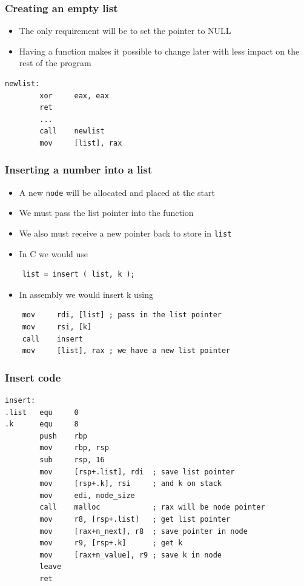 \documentclass{beamer}
\begin{document}
\begin{frame}[fragile]
    \frametitle{Creating an empty list}
    \begin{itemize}
        \item The only requirement will be to set the pointer to NULL
        \item Having a function makes it possible to change later with
              less impact on the rest of the program
    \end{itemize}

\begin{verbatim}
newlist:
        xor     eax, eax
        ret
        ...
        call    newlist
        mov     [list], rax
\end{verbatim}
\end{frame}

\begin{frame}[fragile]
    \frametitle{Inserting a number into a list}
    \begin{itemize}
        \item A new {\tt node} will be allocated and placed at the start
        \item We must pass the list pointer into the function
        \item We also must receive a new pointer back to store in {\tt list}
        \item In C we would use
    \end{itemize}
\begin{verbatim}
    list = insert ( list, k );
\end{verbatim}    
    \begin{itemize}
        \item In assembly we would insert k using
    \end{itemize}
\begin{verbatim}
    mov     rdi, [list] ; pass in the list pointer
    mov     rsi, [k]
    call    insert
    mov     [list], rax ; we have a new list pointer
\end{verbatim}
\end{frame}

\begin{frame}[fragile]
    \frametitle{Insert code}
\begin{verbatim}
insert:
.list   equ     0
.k      equ     8
        push    rbp
        mov     rbp, rsp
        sub     rsp, 16
        mov     [rsp+.list], rdi  ; save list pointer
        mov     [rsp+.k], rsi     ; and k on stack
        mov     edi, node_size
        call    malloc            ; rax will be node pointer
        mov     r8, [rsp+.list]   ; get list pointer
        mov     [rax+n_next], r8  ; save pointer in node
        mov     r9, [rsp+.k]      ; get k
        mov     [rax+n_value], r9 ; save k in node
        leave
        ret
\end{verbatim}    
\end{frame}
\end{document}
